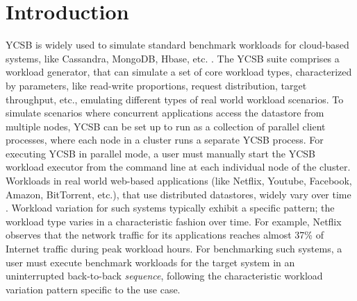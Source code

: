 \documentclass[conference]{IEEEtran}
\begin{document}
\section{Introduction}

YCSB \cite{Cooper:2010:BCS:1807128.1807152} is widely used to simulate standard benchmark workloads for cloud-based systems, like Cassandra, MongoDB, Hbase, etc. \cite{Lakshman:2010:CDS:1773912.1773922,Chodorow:2010:MDG:1941134}. %
           The YCSB suite comprises a workload generator, that can simulate a set of core workload types, characterized by parameters, like read-write proportions, request distribution, target throughput, etc., emulating different types of real world workload scenarios.
             To simulate scenarios where concurrent applications access the datastore from multiple nodes, YCSB can be set up to run as a collection of parallel client processes, where each node in a cluster runs a separate YCSB process. For executing YCSB in parallel mode, a user must manually start the YCSB workload executor from the command line at each individual node of the cluster. %
              Workloads in real world web-based applications (like Netflix, Youtube, Facebook, Amazon, BitTorrent, etc.), that use distributed datastores, widely vary over time \cite{NetflixWorkload-Variation}. Workload variation for such systems typically exhibit a specific pattern; the workload type varies in a characteristic fashion over time. For example, Netflix \cite{NetflixWorkload-Variation} observes that the network traffic for its applications reaches almost 37\% of Internet traffic during peak workload hours.
             For benchmarking such systems, a user must execute benchmark workloads for the
            target system in an uninterrupted back-to-back \emph{sequence}, following the characteristic workload variation pattern specific to the use case.
\end{document}
